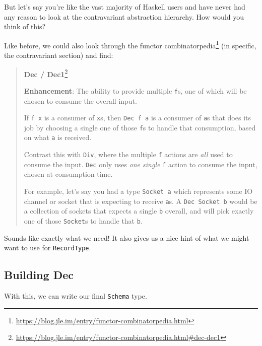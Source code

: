 \documentclass[]{article}
\renewcommand{\href}[2]{#2\footnote{\url{#1}}}
\begin{document}
But let's say you're like the vast majority of Haskell users and have never had
any reason to look at the contravariant abstraction hierarchy. How would you
think of this?

Like before, we could also look through the
\href{https://blog.jle.im/entry/functor-combinatorpedia.html}{functor
combinatorpedia} (in specific, the contravariant section) and find:

\begin{quote}
\href{https://blog.jle.im/entry/functor-combinatorpedia.html\#dec-dec1}{\textbf{Dec
/ Dec1}}

\textbf{Enhancement}: The ability to provide multiple \texttt{f}s, one of which
will be chosen to consume the overall input.

If \texttt{f\ x} is a consumer of \texttt{x}s, then \texttt{Dec\ f\ a} is a
consumer of \texttt{a}s that does its job by choosing a single one of those
\texttt{f}s to handle that consumption, based on what \texttt{a} is received.

Contrast this with \texttt{Div}, where the multiple \texttt{f} actions are
\emph{all} used to consume the input. \texttt{Dec} only uses \emph{one single}
\texttt{f} action to consume the input, chosen at consumption time.

For example, let's say you had a type \texttt{Socket\ a} which represents some
IO channel or socket that is expecting to receive \texttt{a}s. A
\texttt{Dec\ Socket\ b} would be a collection of sockets that expects a single
\texttt{b} overall, and will pick exactly one of those \texttt{Socket}s to
handle that \texttt{b}.
\end{quote}

Sounds like exactly what we need! It also gives us a nice hint of what we might
want to use for \texttt{RecordType}.

\hypertarget{building-dec}{%
\subsection{Building Dec}\label{building-dec}}

With this, we can write our final \texttt{Schema} type.
\end{document}
